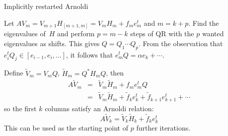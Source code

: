 {Implicitly restarted Arnoldi}

Let $AV_m=V_{m+1}H_{[m+1,m]}=V_mH_m+f_me_m^t$ and $m=k+p$. 
Find the eigenvalues of~$H$ and perform $p=m-k$ steps of QR with the
$p$ wanted eigenvalues as shifts. This gives
$Q=Q_1\cdots Q_p$. From the observation that
$e_i^tQ_j\in[{e_{i-1},e_i,\ldots}]$, it follows that $e_m^tQ=\alpha
e_k+\cdots$.

Define $\tilde V_m=V_mQ$, $\tilde H_m=Q^*H_mQ$, then
\begin{eqnarray*}
    A\tilde V_m&=&\tilde V_m\tilde H_m+f_me_m^tQ\\
                &=&\tilde V_m\tilde H_m+\tilde f_ke_k^t+\tilde
                    f_{k+1}e_{k+1}^t+\cdots
\end{eqnarray*}
so the first $k$ columns satisfy an Arnoldi relation:
\[ A\tilde V_k=\tilde V_k\tilde H_k+\tilde f_ke_k^t \]
This can be used as the starting point of $p$ further iterations.
